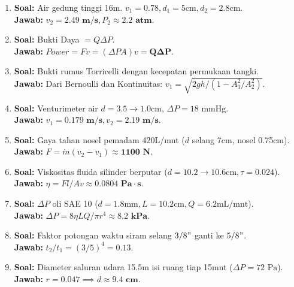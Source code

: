 \documentclass{article}
\begin{document}
\begin{enumerate}[label=\textbf{\arabic*.}]
    \item \textbf{Soal:} Air gedung tinggi 16m. $v_1=0.78, d_1=5\text{cm}, d_2=2.8\text{cm}$. \\
    \textbf{Jawab:} $v_2 = \mathbf{2.49 \text{ m/s}}, P_2 \approx \mathbf{2.2 \text{ atm}}$.

    \item \textbf{Soal:} Bukti Daya $= Q \Delta P$. \\
    \textbf{Jawab:} $Power = Fv = (\Delta P A)v = \mathbf{Q \Delta P}$.

    \item \textbf{Soal:} Bukti rumus Torricelli dengan kecepatan permukaan tangki. \\
    \textbf{Jawab:} Dari Bernoulli dan Kontinuitas: $v_1 = \sqrt{2gh / (1 - A_1^2/A_2^2)}$.

    \item \textbf{Soal:} Venturimeter air $d=3.5 \to 1.0\text{cm}$, $\Delta P = 18 \text{ mmHg}$. \\
    \textbf{Jawab:} $v_1 = \mathbf{0.179 \text{ m/s}}, v_2 = \mathbf{2.19 \text{ m/s}}$.

    \item \textbf{Soal:} Gaya tahan nosel pemadam 420L/mnt ($d$ selang 7cm, nosel 0.75cm). \\
    \textbf{Jawab:} $F = \dot{m}(v_2-v_1) \approx \mathbf{1100 \text{ N}}$.

    \item \textbf{Soal:} Viskositas fluida silinder berputar ($d = 10.2 \to 10.6\text{cm}, \tau = 0.024$). \\
    \textbf{Jawab:} $\eta = Fl/Av \approx \mathbf{0.0804 \text{ Pa}\cdot s}$.

    \item \textbf{Soal:} $\Delta P$ oli SAE 10 ($d=1.8\text{mm}, L=10.2\text{cm}, Q=6.2\text{mL/mnt}$). \\
    \textbf{Jawab:} $\Delta P = 8\eta LQ/\pi r^4 \approx \mathbf{8.2 \text{ kPa}}$.

    \item \textbf{Soal:} Faktor potongan waktu siram selang $3/8"$ ganti ke $5/8"$. \\
    \textbf{Jawab:} $t_2/t_1 = (3/5)^4 = \mathbf{0.13}$.

    \item \textbf{Soal:} Diameter saluran udara 15.5m isi ruang tiap 15mnt ($\Delta P = 72 \text{ Pa}$). \\
    \textbf{Jawab:} $r = 0.047 \implies d \approx \mathbf{9.4 \text{ cm}}$.


\end{enumerate}
\end{document}

